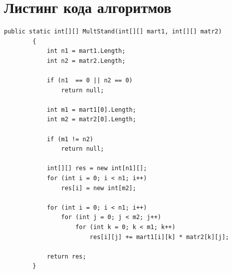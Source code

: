 \documentclass[12pt]{report}
\begin{document}
\section{Листинг кода алгоритмов}

\begin{lstlisting}[label=CodeStand,caption= Стандартный алгоритм умножения матриц]
public static int[][] MultStand(int[][] mart1, int[][] matr2)
        {
            int n1 = mart1.Length;
            int n2 = matr2.Length;

            if (n1  == 0 || n2 == 0)
                return null;

            int m1 = mart1[0].Length;
            int m2 = matr2[0].Length;

            if (m1 != n2)
                return null;

            int[][] res = new int[n1][];
            for (int i = 0; i < n1; i++)
                res[i] = new int[m2];

            for (int i = 0; i < n1; i++)
                for (int j = 0; j < m2; j++)
                    for (int k = 0; k < m1; k++)
                        res[i][j] += mart1[i][k] * matr2[k][j];

            return res;
        }
\end{lstlisting}
\end{document}

